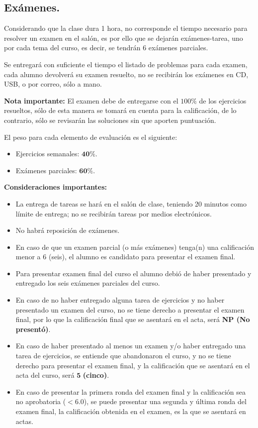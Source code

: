 \documentclass[12pt]{article}
\begin{document}
\subsection{Exámenes.}
Considerando que la clase dura 1 hora, no corresponde el tiempo necesario para resolver un examen en el salón, es por ello que se dejarán exámenes-tarea, uno por cada tema del curso, es decir, se tendrán 6 exámenes parciales.
\par
Se entregará con suficiente el tiempo el listado de problemas para cada examen, cada alumno devolverá su examen resuelto, no se recibirán los exámenes en CD, USB, o por correo, sólo a mano.
\par
\textbf{Nota importante: } El examen debe de entregarse con el $100\%$ de los ejercicios resueltos, sólo de esta manera se tomará en cuenta para la calificación, de lo contrario, sólo se revisarán las soluciones sin que aporten puntuación.
\par
El peso para cada elemento de evaluación es el siguiente:
\begin{itemize}
\setlength{\itemsep}{0mm}
\item Ejercicios semanales: $\mathbf{40\%}$.
\item Exámenes parciales: $\mathbf{60\%}$.
\end{itemize}
\textbf{Consideraciones importantes:}
\begin{itemize}
\setlength{\itemsep}{0mm}
\item La entrega de tareas se hará en el salón de clase, teniendo 20 minutos como límite de entrega; no se recibirán tareas por medios electrónicos.
\item No habrá reposición de exámenes.
\item En caso de que un examen parcial (o más exámenes) tenga(n) una calificación menor a $6$ (seis), el alumno es candidato para presentar el examen final.
\item Para presentar examen final del curso el alumno debió de haber presentado y entregado los seis exámenes parciales del curso.
\item En caso de no haber entregado alguna tarea de ejercicios y no haber presentado un examen del curso, no se tiene derecho a presentar el examen final, por lo que la calificación final que se asentará en el acta, será \textbf{NP (No presentó)}.
\item En caso de haber presentado al menos un examen y/o haber entregado una tarea de ejercicios, se entiende que abandonaron el curso, y no se tiene derecho para presentar el examen final, y la calificación que se asentará en el acta del curso, será $\mathbf{5}$ \textbf{(cinco)}.
\item En caso de presentar la primera ronda del examen final y la calificación sea no aprobatoria ($<6.0$), se puede presentar una segunda y última ronda del examen final, la calificación obtenida en el examen, es la que se asentará en actas.
\end{itemize}
\end{document}
